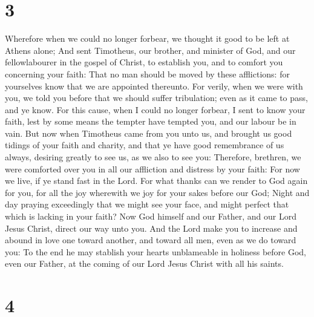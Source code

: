 \hypertarget{section-2}{%
\section{3}\label{section-2}}

 Wherefore when we could no longer forbear, we thought it
good to be left at Athens alone;  And sent Timotheus, our
brother, and minister of God, and our fellowlabourer in the gospel of
Christ, to establish you, and to comfort you concerning your faith:
 That no man should be moved by these afflictions: for
yourselves know that we are appointed thereunto.  For
verily, when we were with you, we told you before that we should suffer
tribulation; even as it came to pass, and ye know.  For this
cause, when I could no longer forbear, I sent to know your faith, lest
by some means the tempter have tempted you, and our labour be in vain.
 But now when Timotheus came from you unto us, and brought
us good tidings of your faith and charity, and that ye have good
remembrance of us always, desiring greatly to see us, as we also to see
you:  Therefore, brethren, we were comforted over you in all
our affliction and distress by your faith:  For now we live,
if ye stand fast in the Lord.  For what thanks can we render
to God again for you, for all the joy wherewith we joy for your sakes
before our God;  Night and day praying exceedingly that we
might see your face, and might perfect that which is lacking in your
faith?  Now God himself and our Father, and our Lord Jesus
Christ, direct our way unto you.  And the Lord make you to
increase and abound in love one toward another, and toward all men, even
as we do toward you:  To the end he may stablish your
hearts unblameable in holiness before God, even our Father, at the
coming of our Lord Jesus Christ with all his saints.

\hypertarget{section-3}{%
\section{4}\label{section-3}}

